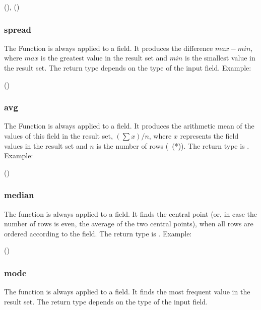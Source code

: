  (), ()
 

\subsubsection{spread}
The Function is always applied to a field.
It produces the difference $max - min$,
where $max$ is the greatest value in the result set
and $min$ is the smallest value in the result set.
The return type depends on the type of the input field.
Example:

 ()
 

\subsubsection{avg}
The Function is always applied to a field.
It produces the arithmetic mean of the values
of this field in the result set, \ie
$\left(\sum{x}\right)/n$, where $x$ represents the
field values in the result set and $n$
is the number of rows (\ie\ (*)).
The return type is .
Example:

 ()
 

\subsubsection{median}
The function is always applied to a field.
It finds the central point (or, in case
the number of rows is even, the average
of the two central points), when all
rows are ordered according to the field.
The return type is .
Example:

 ()
 


\subsubsection{mode}
The function is always applied to a field.
It finds the most frequent value in the result set.
The return type depends on the type of the input field.

